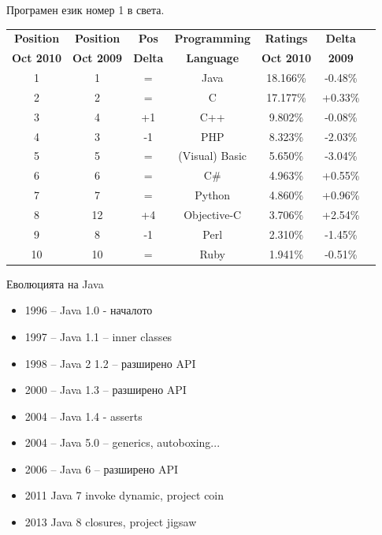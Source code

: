 \documentclass{beamer}
\begin{document}
\begin{frame}{Програмен език номер 1 в света.}
  \transdissolve
  \begin{tabular}{|c|c|c|c|c|c|c|}
    \hline
    \textbf{Position} &
    \textbf{Position} & \textbf{Pos} & \textbf{Programming} &
    \textbf{Ratings} & \textbf{Delta} \\
    \textbf{Oct 2010} &
    \textbf{Oct 2009} & \textbf{Delta} & \textbf{Language} &
    \textbf{Oct 2010} & \textbf{2009} \\ 
    \hline
    \hline
    1 & 1 & = & Java & 18.166\% & -0.48\% \\
    \hline
    2 & 2 & = & C & 17.177\% & +0.33\% \\
    \hline
    3 & 4 & +1 & C++ & 9.802\% & -0.08\% \\
    \hline
    4 & 3 & -1 & PHP & 8.323\% & -2.03\% \\
    \hline
    5 & 5 & = & (Visual) Basic & 5.650\% & -3.04\% \\
    \hline
    6 & 6 & = & C\# & 4.963\% & +0.55\% \\
    \hline
    7 & 7 & = & Python & 4.860\% & +0.96\% \\
    \hline
    8 & 12 & +4 & Objective-C & 3.706\% & +2.54\% \\
    \hline
    9 & 8 & -1 & Perl & 2.310\% & -1.45\% \\
    \hline
    10 & 10 & = & Ruby & 1.941\% & -0.51\% \\
    \hline
  \end{tabular}
\end{frame}

\begin{frame}{Еволюцията на Java}
  \transdissolve
  \begin{itemize}
  \item 1996 – Java 1.0 - началото
  \item 1997 – Java 1.1 – inner classes
  \item 1998 – Java 2 1.2 – разширено API
  \item 2000 – Java 1.3 – разширено API
  \item 2004 – Java 1.4 - asserts
  \item 2004 – Java 5.0 – generics, autoboxing...
  \item 2006 – Java 6 – разширено API
  \item 2011   Java 7 invoke dynamic, project coin
  \item 2013   Java 8 closures, project jigsaw
  \end{itemize}
\end{frame}
\end{document}

